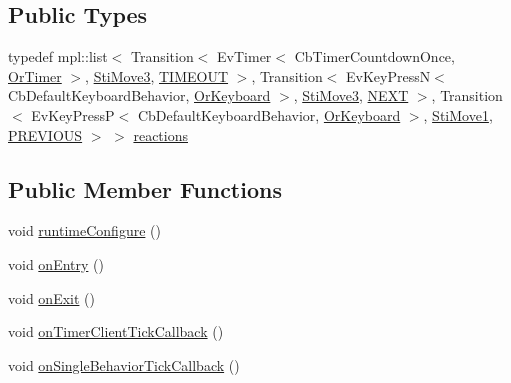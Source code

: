 \subsection*{Public Types}
\begin{DoxyCompactItemize}
\item 
typedef mpl\+::list$<$ Transition$<$ Ev\+Timer$<$ Cb\+Timer\+Countdown\+Once, \hyperlink{classsm__starcraft__ai_1_1OrTimer}{Or\+Timer} $>$, \hyperlink{structsm__starcraft__ai_1_1move__inner__states_1_1StiMove3}{Sti\+Move3}, \hyperlink{structsm__starcraft__ai_1_1move__inner__states_1_1StiMove2_1_1TIMEOUT}{T\+I\+M\+E\+O\+UT} $>$, Transition$<$ Ev\+Key\+PressN$<$ Cb\+Default\+Keyboard\+Behavior, \hyperlink{classsm__starcraft__ai_1_1OrKeyboard}{Or\+Keyboard} $>$, \hyperlink{structsm__starcraft__ai_1_1move__inner__states_1_1StiMove3}{Sti\+Move3}, \hyperlink{structsm__starcraft__ai_1_1move__inner__states_1_1StiMove2_1_1NEXT}{N\+E\+XT} $>$, Transition$<$ Ev\+Key\+PressP$<$ Cb\+Default\+Keyboard\+Behavior, \hyperlink{classsm__starcraft__ai_1_1OrKeyboard}{Or\+Keyboard} $>$, \hyperlink{structsm__starcraft__ai_1_1move__inner__states_1_1StiMove1}{Sti\+Move1}, \hyperlink{structsm__starcraft__ai_1_1move__inner__states_1_1StiMove2_1_1PREVIOUS}{P\+R\+E\+V\+I\+O\+US} $>$ $>$ \hyperlink{structsm__starcraft__ai_1_1move__inner__states_1_1StiMove2_a8187cf9544687d15078665a7065c1360}{reactions}
\end{DoxyCompactItemize}
\subsection*{Public Member Functions}
\begin{DoxyCompactItemize}
\item 
void \hyperlink{structsm__starcraft__ai_1_1move__inner__states_1_1StiMove2_ab3b82e554437f2d8140a55da2d23ea51}{runtime\+Configure} ()
\item 
void \hyperlink{structsm__starcraft__ai_1_1move__inner__states_1_1StiMove2_a837f908f65fd3e5fa1135886fd615a92}{on\+Entry} ()
\item 
void \hyperlink{structsm__starcraft__ai_1_1move__inner__states_1_1StiMove2_a26e877ff946b3193d1eb72502ecab20c}{on\+Exit} ()
\item 
void \hyperlink{structsm__starcraft__ai_1_1move__inner__states_1_1StiMove2_a1a2c7056ff3fe7a55f1d9a08a29b374f}{on\+Timer\+Client\+Tick\+Callback} ()
\item 
void \hyperlink{structsm__starcraft__ai_1_1move__inner__states_1_1StiMove2_adaca8083c53db1b32438d1df4575d3f7}{on\+Single\+Behavior\+Tick\+Callback} ()
\end{DoxyCompactItemize}
